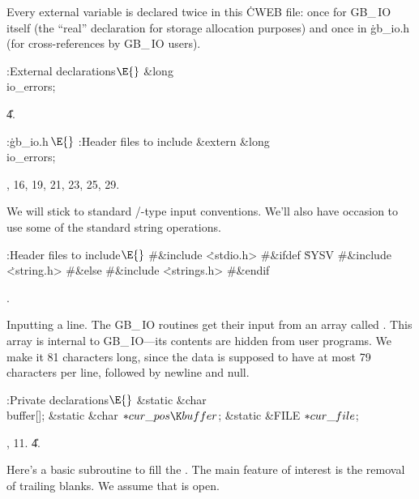 Every external variable is declared twice in this \.{CWEB} file:
once for {\sc GB\_\,IO} itself (the ``real'' declaration for storage
allocation purposes) and once in \.{gb\_io.h} (for cross-references
by {\sc GB\_\,IO} users).

\Y\B\4:External declarations\X${}\E{}$\6
\&{long} \\{io\_errors};\par
\U4.\fi

\B{}:\.{gb\_io.h\,}\X${}\E{}$\6
:Header files to include\X\7
\&{extern} \&{long} \\{io\_errors};\par
{}, 16, 19, 21, 23, 25, 29.\fi

We will stick to standard \CEE/-type input conventions. We'll also have
occasion to use some of the standard string operations.

\Y\B\4:Header files to include\X${}\E{}$\6
\8\#\&{include} \.{<stdio.h>}\6
\8\#\&{ifdef} \.{SYSV}\6
\8\#\&{include} \.{<string.h>}\6
\8\#\&{else}\6
\8\#\&{include} \.{<strings.h>}\6
\8\#\&{endif}\par
{}.\fi

Inputting a line. The {\sc GB\_\,IO} routines get their input from
an array called . This array is internal to {\sc
GB\_\,IO}---its contents are hidden from user programs. We make it 81
characters long, since the data is supposed to have at most 79
characters per line, followed by newline and null.

\Y\B\4:Private declarations\X${}\E{}$\6
\&{static} \&{char} \\{buffer}[];\6
\&{static} \&{char} ${}{*}\\{cur\_pos}\K\\{buffer}{}$;\6
\&{static} \&{FILE} ${}{*}\\{cur\_file}{}$;\par
{}, 11.
\U4.\fi

Here's a basic subroutine to fill the . The main feature of
interest
is the removal of trailing blanks. We assume that  is open.

